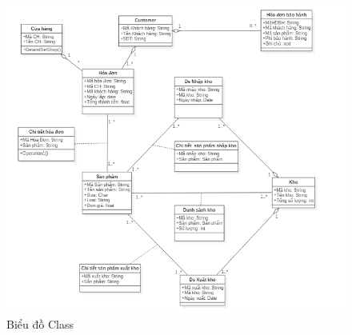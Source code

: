 \documentclass{article}
\begin{document}
\begin{figure}
    \centering
    \includegraphics{7.png}
    \caption{Biểu đồ Class}
\end{figure}
\end{document}
